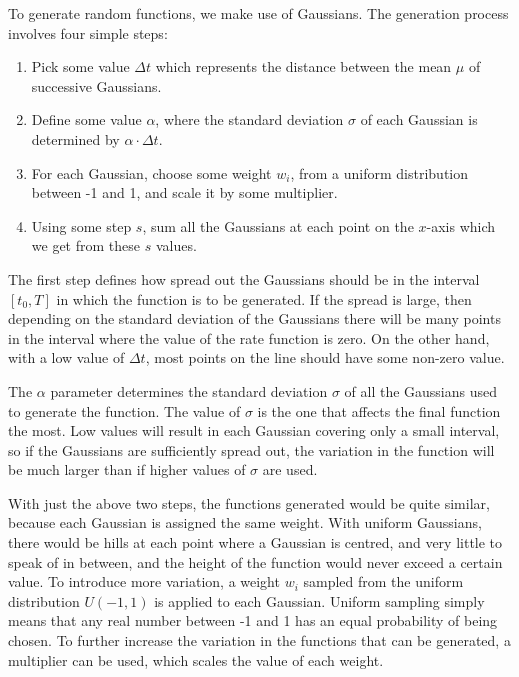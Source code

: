 \documentclass[a4paper,11pt]{article}
\begin{document}
   To generate random functions, we make use of Gaussians. The generation process
   involves four simple steps:
\begin{enumerate}
\item Pick some value $\Delta t$ which represents the distance between the mean
   $\mu$ of successive Gaussians.
\item Define some value $\alpha$, where the standard deviation $\sigma$ of each
   Gaussian is determined by $\alpha\cdot\Delta t$.
\item For each Gaussian, choose some weight $w_i$, from a uniform distribution
   between -1 and 1, and scale it by some multiplier.
\item Using some step $s$, sum all the Gaussians at each point on the $x$-axis which
   we get from these $s$ values.
\end{enumerate}

   The first step defines how spread out the Gaussians should be in the interval
   $[t_0, T]$ in which the function is to be generated. If the spread is large,
   then depending on the standard deviation of the Gaussians there will be many
   points in the interval where the value of the rate function is zero. On the
   other hand, with a low value of $\Delta t$, most points on the line should
   have some non-zero value.

   The $\alpha$ parameter determines the standard deviation $\sigma$ of all the
   Gaussians used to generate the function. The value of $\sigma$ is the one
   that affects the final function the most. Low values will result in each
   Gaussian covering only a small interval, so if the Gaussians are sufficiently
   spread out, the variation in the function will be much larger than if higher
   values of $\sigma$ are used.

   With just the above two steps, the functions generated would be quite
   similar, because each Gaussian is assigned the same weight. With uniform
   Gaussians, there would be hills at each point where a Gaussian is centred,
   and very little to speak of in between, and the height of the function would
   never exceed a certain value. To introduce more variation, a weight $w_i$
   sampled from the uniform distribution $U(-1,1)$ is applied to each
   Gaussian. Uniform sampling simply means that any real number between -1 and 1
   has an equal probability of being chosen. To further increase the variation
   in the functions that can be generated, a multiplier can be used, which
   scales the value of each weight.
\end{document}
